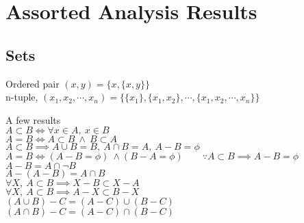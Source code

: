 
\chapter{Assorted Analysis Results}
\section{Sets}
	\begin{definition}
		Ordered pair $(x,y) = \{ x,\{x,y\} \}$\\
		n-tuple, $(x_1, x_2, \cdots, x_n) = \{ \{x_1\}, \{x_1, x_2\}, \cdots,\{x_1, x_2, \cdots, x_n\}\}$
	\end{definition}
	\begin{remark}A few results\\
		$A \subset B \iff \forall x \in A,\ x \in B$\\
		$A = B \iff A \subset B \ \wedge \ B \subset A$\\
		$A \subset B \implies A \cup B = B,\ A \cap B = A,\ A-B = \phi$\\
		$A = B \iff (A-B=\phi) \ \wedge (B-A=\phi) \qquad \because A \subset B \implies A-B=\phi$\\
		$A-B = A \cap \neg B$\\
		$A-(A-B) = A \cap B$\\
		$\forall X,\ A \subset B \implies X-B \subset X-A$\\
		$\forall X,\ A \subset B \implies A-X \subset B-X$\\
		$(A \cup B) - C = (A-C) \cup (B-C)$\\
		$(A \cap B) - C = (A-C) \cap (B-C)$
	\end{remark}
